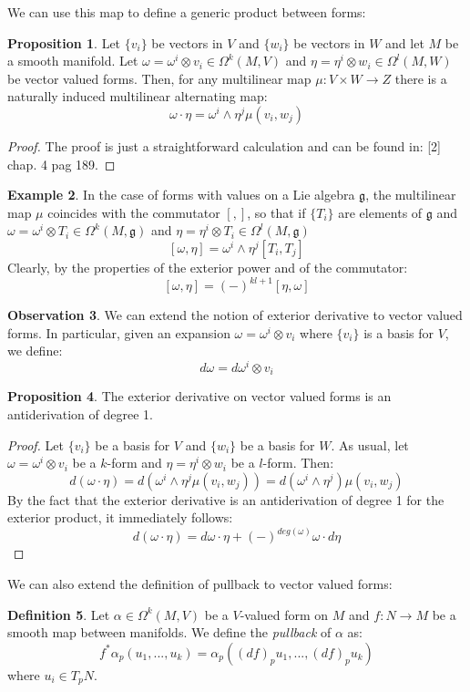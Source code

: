\documentclass[12pt,a4paper]{report}
\theoremstyle{definition}
\newtheorem{Def}{Definition}[chapter]
\theoremstyle{Theorem}
\newtheorem{Prop}[Def]{Proposition}
\theoremstyle{definition}
\newtheorem{Ex}[Def]{Example}
\theoremstyle{definition}
\newtheorem{Obs}[Def]{Observation}
\begin{document}
	We can use this map to define a generic product between forms:
	\begin{Prop}
		Let $\{v_i\}$ be vectors in $V$ and $\{w_i\}$ be vectors in $W$ and let $M$ be a smooth manifold. Let $\omega=\omega^i\otimes v_i\in\Omega^k(M,V)$ and $\eta=\eta^i\otimes w_i\in\Omega^l(M,W)$ be vector valued forms. Then, for any multilinear map $\mu:V\times W\rightarrow Z$ there is a naturally induced multilinear alternating map:
		$$\omega\cdot \eta=\omega^i\wedge\eta^j \mu(v_i,w_j)$$
	\end{Prop}
	\begin{proof}
		The proof is just a straightforward calculation and can be found in: [2] chap. 4 pag 189.
	\end{proof}
	\begin{Ex}\label{Ex_3.5.1}
		In the case of forms with values on a Lie algebra $\mathfrak{g}$, the multilinear map $\mu$ coincides with the commutator $[,]$, so that if $\{T_i\}$ are elements of $\mathfrak{g}$ and $\omega=\omega^i\otimes T_i\in\Omega^k(M,\mathfrak{g})$ and $\eta=\eta^i\otimes T_i\in\Omega^l(M,\mathfrak{g})$
		$$[\omega,\eta]=\omega^i\wedge\eta^j[T_i,T_j]$$
		Clearly, by the properties of the exterior power and of the commutator:
		$$[\omega,\eta]=(-)^{kl+1}[\eta,\omega]$$
	\end{Ex}
	\begin{Obs}
		We can extend the notion of exterior derivative to vector valued forms. In particular, given an expansion $\omega=\omega^i\otimes v_i$ where $\{v_i\}$ is a basis for $V$, we define:
		$$d\omega=d\omega^i\otimes v_i$$
	\end{Obs}
	\begin{Prop}
		The exterior derivative on vector valued forms is an antiderivation of degree 1.
	\end{Prop}
	\begin{proof}
		Let $\{v_i\}$ be a basis for $V$ and $\{w_i\}$ be a basis for $W$. As usual, let $\omega=\omega^i\otimes v_i$ be a $k$-form and $\eta=\eta^i\otimes w_i$ be a $l$-form. Then:
		$$d(\omega\cdot \eta)=d(\omega^i\wedge\eta^j\mu(v_i,w_j))=d(\omega^i\wedge\eta^j)\mu(v_i,w_j)$$
		By the fact that the exterior derivative is an antiderivation of degree 1 for the exterior product, it immediately follows:
		$$d(\omega\cdot \eta)=d\omega\cdot \eta+(-)^{deg(\omega)}\omega\cdot d\eta$$
	\end{proof}
	We can also extend the definition of pullback to vector valued forms:
	\begin{Def}
		Let $\alpha\in\Omega^k(M,V)$ be a $V$-valued form on $M$ and $f:N\rightarrow M$ be a smooth map between manifolds. We define the \textit{pullback} of $\alpha$ as:
		$$f^*\alpha_p(u_1,...,u_k)=\alpha_p((df)_pu_1,...,(df)_pu_k)$$
		where $u_i\in T_pN$.
	\end{Def}
\end{document}
